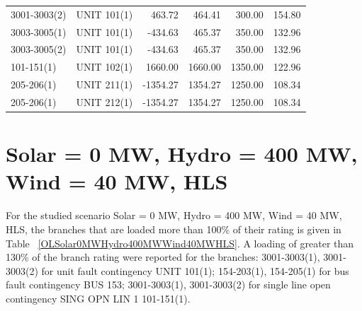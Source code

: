 \documentclass[10pt]{report}
\begin{document}
\begin{table}[H]
{\begin{tabular}{llrrrr}
3001-3003(2) & UNIT 101(1) & 463.72 & 464.41 & 300.00 & 154.80 \\
3003-3005(1) & UNIT 101(1) & -434.63 & 465.37 & 350.00 & 132.96 \\
3003-3005(2) & UNIT 101(1) & -434.63 & 465.37 & 350.00 & 132.96 \\
101-151(1) & UNIT 102(1) & 1660.00 & 1660.00 & 1350.00 & 122.96 \\
205-206(1) & UNIT 211(1) & -1354.27 & 1354.27 & 1250.00 & 108.34 \\
205-206(1) & UNIT 212(1) & -1354.27 & 1354.27 & 1250.00 & 108.34 \\
\bottomrule
\end{tabular}}
\end{table}

\section{Solar = 0 MW, Hydro = 400 MW, Wind = 40 MW, HLS}
For the studied scenario Solar = 0 MW, Hydro = 400 MW, Wind = 40 MW, HLS, the branches that are loaded more than 100\% of their rating is given in Table ~\ref{OLSolar0MWHydro400MWWind40MWHLS}. A loading of greater than 130\% of the branch rating were reported for the branches: 3001-3003(1), 3001-3003(2) for unit fault contingency UNIT 101(1); 154-203(1), 154-205(1) for bus fault contingency BUS 153; 3001-3003(1), 3001-3003(2) for single line open contingency SING OPN LIN   1 101-151(1).
\end{document}

